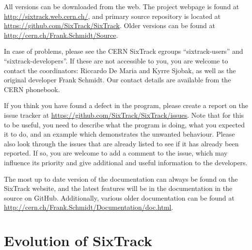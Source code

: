 All versions can be downloaded from the web.
The project webpage is found at \url{http://sixtrack.web.cern.ch/}, and primary source repository is located at \url{https://github.com/SixTrack/SixTrack}.
Older versions can be found at \url{http://cern.ch/Frank.Schmidt/Source}.

In case of problems, please see the CERN SixTrack egroups ``sixtrack-users'' and ``sixtrack-developers''.
If these are not accessible to you, you are welcome to contact the coordinators: Riccardo De Maria and Kyrre Sjobak, as well as the original developer Frank Schmidt.
Our contact details are available from the CERN phonebook.

If you think you have found a defect in the program, please create a report on the issue tracker at \url{https://github.com/SixTrack/SixTrack/issues}.
Note that for this to be useful, you need to describe what the program is doing, what you expected it to do, and an example which demonstrates the unwanted behaviour.
Please also look through the issues that are already listed to see if it has already been reported.
If so, you are welcome to add a comment to the issue, which may influence its priority and give additional and useful information to the developers.

The most up to date version of the documentation can always be found on the SixTrack website, and the latest features will be in the documentation in the source on GitHub.
Additionally, various older documentation can be found at \url{http://cern.ch/Frank.Schmidt/Documentation/doc.html}.

\section{Evolution of SixTrack}

